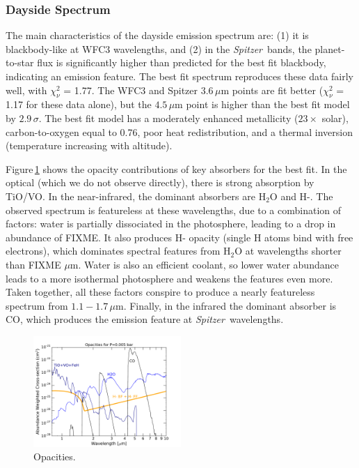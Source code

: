 \documentclass[twocolumn]{aastex61}
\newcommand{\project}[1]{\textsl{#1}}
\newcommand{\Spitzer}{\project{Spitzer}}
\begin{document}
\subsubsection{Dayside Spectrum}
The main characteristics of the dayside emission spectrum are: (1) it is blackbody-like at WFC3 wavelengths, and (2) in the \Spitzer\ bands, the planet-to-star flux is significantly higher than predicted for the best fit blackbody, indicating an emission feature.  The best fit spectrum reproduces these data fairly well, with $\chi^2_\nu$ = 1.77. The WFC3 and Spitzer $3.6\,\mu$m points are fit better ($\chi^2_\nu$  = 1.17 for these data alone), but the $4.5\,\mu$m point is higher than the best fit model by $2.9\,\sigma$.  The best fit model has a moderately enhanced metallicity ($23\times$ solar), carbon-to-oxygen equal to 0.76, poor heat redistribution, and a thermal inversion (temperature increasing with altitude).

Figure\,\ref{fig:opacities} shows the opacity contributions of key absorbers for the best fit.  In the optical (which we do not observe directly), there is strong absorption by TiO/VO.  In the near-infrared, the dominant absorbers are H$_2$O and H-.  The observed spectrum is featureless at these wavelengths, due to a combination of factors: water is partially dissociated in the photosphere, leading to a drop in abundance of FIXME.  It also produces H- opacity (single H atoms bind with free electrons), which dominates spectral features from H$_2$O at wavelengths shorter than FIXME $\mu$m.  Water is also an efficient coolant, so lower water abundance leads to a more isothermal photosphere and weakens the features even more.  Taken together, all these factors conspire to produce a nearly featureless spectrum from $1.1 - 1.7\,\mu$m. Finally, in the infrared the dominant absorber is CO, which produces the emission feature at \Spitzer\ wavelengths.  

\begin{figure}
\includegraphics[width = 0.5\textwidth]{Figures/xsec_FULL.pdf}
\caption{Opacities.}
\label{fig:opacities}
\end{figure}
\end{document}
